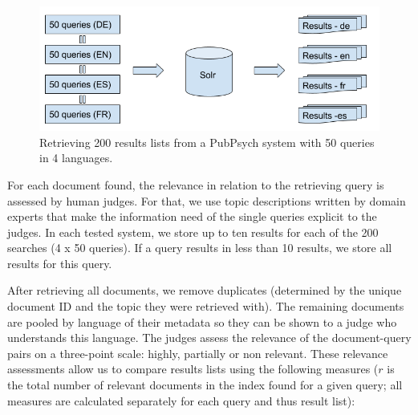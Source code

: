 \documentclass[a4paper,11pt]{article}
\begin{document}
\begin{figure}[!hb]
\centering
\includegraphics[width=14cm]{./img/queries.png}
\caption{Retrieving 200 results lists from a PubPsych system with 50 queries in 4 languages.}
\label{fig:queries}
\end{figure}

For each document found, the relevance in relation to the retrieving query is assessed by human judges. For that, we use topic descriptions written by domain experts that make the information need of the single queries explicit to the judges. In each tested system, we store up to ten results for each of the 200 searches (4 x 50 queries). If a query results in less than 10 results, we store all results for this query. 

After retrieving all documents, we remove duplicates (determined by the unique document ID and the topic they were retrieved with). The remaining documents are pooled by language of their metadata so they can be shown to a judge who understands this language. The judges assess the relevance of the document-query pairs on a three-point scale: highly, partially or non relevant. These relevance assessments allow us to compare results lists using the following measures ($r$ is the total number of relevant documents in the index found for a given query; all measures are calculated separately for each query and thus result list):
\end{document}
